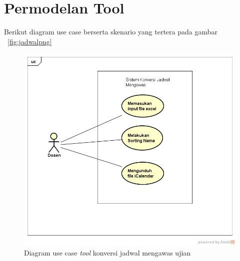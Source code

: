 \section{Permodelan Tool}

Berikut diagram use case berserta skenario yang tertera pada gambar ~\ref{fig:jadwalpng}

\begin{figure}[h]
	\centering
	\includegraphics[scale=0.5]{Gambar/useCaseJadwal}
	\caption{Diagram use case \textit{tool} konversi jadwal mengawas ujian}
	\end{figure}

